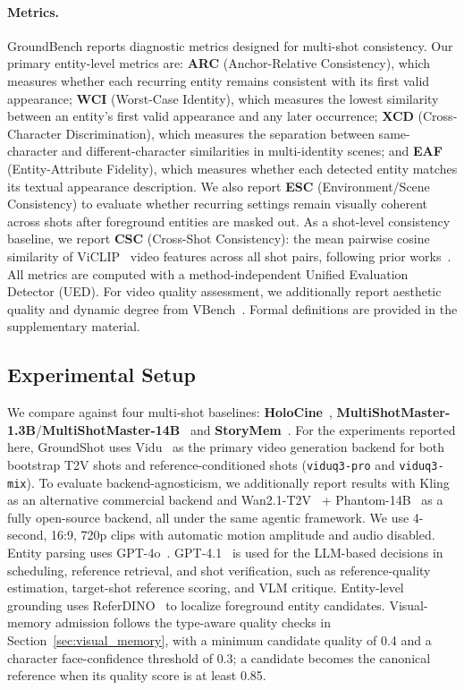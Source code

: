 \paragraph{Metrics.}
GroundBench reports diagnostic metrics designed for multi-shot consistency.
Our primary entity-level metrics are: \textbf{ARC} (Anchor-Relative Consistency), which measures whether each recurring entity remains consistent with its first valid appearance; \textbf{WCI} (Worst-Case Identity), which measures the lowest similarity between an entity's first valid appearance and any later occurrence; \textbf{XCD} (Cross-Character Discrimination), which measures the separation between same-character and different-character similarities in multi-identity scenes; and \textbf{EAF} (Entity-Attribute Fidelity), which measures whether each detected entity matches its textual appearance description. We also report \textbf{ESC} (Environment/Scene Consistency) to evaluate whether recurring settings remain visually coherent across shots after foreground entities are masked out.
As a shot-level consistency baseline, we report \textbf{CSC} (Cross-Shot Consistency): the mean pairwise cosine similarity of ViCLIP~\cite{wang2023internvid_viclip} video features across all shot pairs, following prior works~\cite{holocine,multishotmaster,storymem}.
All metrics are computed with a method-independent Unified Evaluation Detector (UED).
For video quality assessment, we additionally report aesthetic quality and dynamic degree from VBench~\cite{huang2024vbench_comprehensive}. Formal definitions are provided in the supplementary material.
\subsection{Experimental Setup}

We compare against four multi-shot baselines:
\textbf{HoloCine}~\cite{holocine}, \textbf{MultiShotMaster-1.3B}/\textbf{MultiShotMaster-14B}~\cite{multishotmaster} and \textbf{StoryMem}~\cite{storymem}.
For the experiments reported here, GroundShot uses Vidu~\cite{vidu} as the primary video generation backend for both bootstrap T2V shots and reference-conditioned shots (\texttt{viduq3-pro} and \texttt{viduq3-mix}).
To evaluate backend-agnosticism, we additionally report results with Kling~\cite{kling} as an alternative commercial backend and Wan2.1-T2V~\cite{wan2024wan} + Phantom-14B~\cite{phantom} as a fully open-source backend, all under the same agentic framework.
We use 4-second, 16:9, 720p clips with automatic motion amplitude and audio disabled.
Entity parsing uses GPT-4o~\cite{gpt4o}. GPT-4.1~\cite{gpt41} is used for the LLM-based decisions in scheduling, reference retrieval, and shot verification, such as reference-quality estimation, target-shot reference scoring, and VLM critique.
Entity-level grounding uses ReferDINO~\cite{liang2025referdino} to localize foreground entity candidates. Visual-memory admission follows the type-aware quality checks in Section~\ref{sec:visual_memory}, with a minimum candidate quality of 0.4 and a character face-confidence threshold of 0.3; a candidate becomes the canonical reference when its quality score is at least 0.85.

